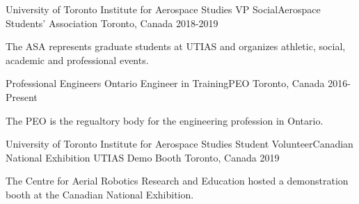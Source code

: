 

\begin{cventries} 

  \cventry
    {University of Toronto Institute for Aerospace Studies} %
    {VP Social{\enskip\cdotp\enskip}Aerospace Students' Association} %
    {Toronto, Canada} %
    {2018-2019} %
    {
      \begin{cvitems} %
        \item {The ASA represents graduate students at UTIAS and organizes athletic, social, academic and professional events.}
      \end{cvitems}
    }
    
  \cventry
    {Professional Engineers Ontario} %
    {Engineer in Training{\enskip\cdotp\enskip}PEO} %
    {Toronto, Canada} %
    {2016-Present} %
    {
      \begin{cvitems} %
        \item {The PEO is the regualtory body for the engineering profession in Ontario.}
      \end{cvitems}
    }
    
  \cventry
    {University of Toronto Institute for Aerospace Studies} %
    {Student Volunteer{\enskip\cdotp\enskip}Canadian National Exhibition UTIAS Demo Booth} %
    {Toronto, Canada} %
    {2019} %
    {
      \begin{cvitems} %
        \item {The Centre for Aerial Robotics Research and Education hosted a demonstration booth at the Canadian National Exhibition.}
       \end{cvitems}
    }

\end{cventries}
